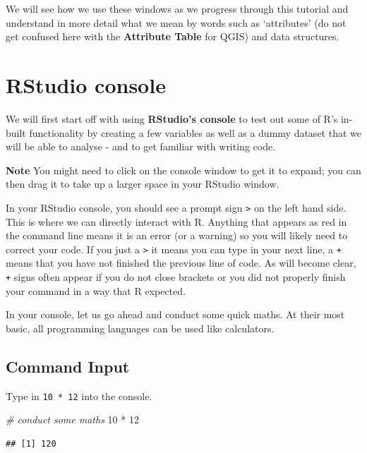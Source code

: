 \documentclass[
]{book}
\newenvironment{Shaded}{\begin{snugshade}}{\end{snugshade}}
\newcommand{\CommentTok}[1]{\textcolor[rgb]{0.56,0.35,0.01}{\textit{#1}}}
\newcommand{\DecValTok}[1]{\textcolor[rgb]{0.00,0.00,0.81}{#1}}
\newcommand{\SpecialCharTok}[1]{\textcolor[rgb]{0.00,0.00,0.00}{#1}}
\begin{document}
We will see how we use these windows as we progress through this tutorial and understand in more detail what we mean by words such as `attributes' (do not get confused here with the \textbf{Attribute Table} for QGIS) and data structures.

\hypertarget{rstudio-console}{%
\section{RStudio console}\label{rstudio-console}}

We will first start off with using \textbf{RStudio's console} to test out some of R's in-built functionality by creating a few variables as well as a dummy dataset that we will be able to analyse - and to get familiar with writing code.

\textbf{Note}
You might need to click on the console window to get it to expand; you can then drag it to take up a larger space in your RStudio window.

In your RStudio console, you should see a prompt sign \texttt{\textgreater{}} on the left hand side. This is where we can directly interact with R. Anything that appears as red in the command line means it is an error (or a warning) so you will likely need to correct your code. If you just a \texttt{\textgreater{}} it means you can type in your next line, a \texttt{+} means that you have not finished the previous line of code. As will become clear, \texttt{+} signs often appear if you do not close brackets or you did not properly finish your command in a way that R expected.

In your console, let us go ahead and conduct some quick maths. At their most basic, all programming languages can be used like calculators.

\hypertarget{command-input}{%
\subsection{Command Input}\label{command-input}}

Type in \texttt{10\ *\ 12} into the console.

\begin{Shaded}
\begin{Highlighting}[]
\CommentTok{\# conduct some maths}
\DecValTok{10} \SpecialCharTok{*} \DecValTok{12}
\end{Highlighting}
\end{Shaded}

\begin{verbatim}
## [1] 120
\end{verbatim}
\end{document}
